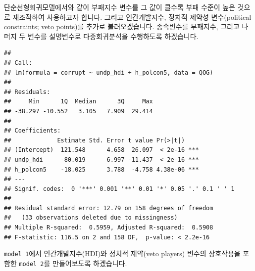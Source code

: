 \documentclass[]{book}
\newenvironment{Shaded}{\begin{snugshade}}{\end{snugshade}}
\newcommand{\DataTypeTok}[1]{\textcolor[rgb]{0.13,0.29,0.53}{#1}}
\newcommand{\DecValTok}[1]{\textcolor[rgb]{0.00,0.00,0.81}{#1}}
\newcommand{\KeywordTok}[1]{\textcolor[rgb]{0.13,0.29,0.53}{\textbf{#1}}}
\newcommand{\NormalTok}[1]{#1}
\newcommand{\OperatorTok}[1]{\textcolor[rgb]{0.81,0.36,0.00}{\textbf{#1}}}
\newcommand{\StringTok}[1]{\textcolor[rgb]{0.31,0.60,0.02}{#1}}
\begin{document}
단순선형회귀모델에서와 같이 부패지수 변수를 그 값이 클수록 부패 수준이 높은 것으로 재조작하여 사용하고자 합니다. 그리고 인간개발지수, 정치적 제약성 변수(political constraints; veto points)를 추가로 불러오겠습니다. 종속변수를 부패지수, 그리고 나머지 두 변수를 설명변수로 다중회귀분석을 수행하도록 하겠습니다.

\begin{Shaded}
\end{Shaded}

\begin{verbatim}
## 
## Call:
## lm(formula = corrupt ~ undp_hdi + h_polcon5, data = QOG)
## 
## Residuals:
##     Min      1Q  Median      3Q     Max 
## -38.297 -10.552   3.105   7.909  29.414 
## 
## Coefficients:
##             Estimate Std. Error t value Pr(>|t|)    
## (Intercept)  121.548      4.658  26.097  < 2e-16 ***
## undp_hdi     -80.019      6.997 -11.437  < 2e-16 ***
## h_polcon5    -18.025      3.788  -4.758 4.38e-06 ***
## ---
## Signif. codes:  0 '***' 0.001 '**' 0.01 '*' 0.05 '.' 0.1 ' ' 1
## 
## Residual standard error: 12.79 on 158 degrees of freedom
##   (33 observations deleted due to missingness)
## Multiple R-squared:  0.5959, Adjusted R-squared:  0.5908 
## F-statistic: 116.5 on 2 and 158 DF,  p-value: < 2.2e-16
\end{verbatim}

\texttt{model\ 1}에서 인간개발지수(HDI)와 정치적 제약(veto players) 변수의 상호작용을 포함한 \texttt{model\ 2}를 만들어보도록 하겠습니다.

\begin{Shaded}
\end{Shaded}
\end{document}
